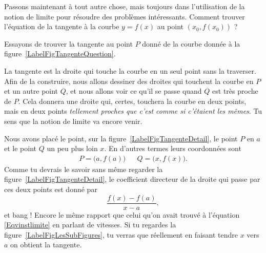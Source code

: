 Passons maintenant à tout autre chose, mais toujours dans l'utilisation de la notion de limite pour résoudre des problèmes intéressants. Comment trouver l'équation de la tangente à la courbe $y=f(x)$ au point $(x_0,f(x_0))$ ?

Essayons de trouver la tangente au point $P$ donné de la courbe donnée à la figure~\ref{LabelFigTangenteQuestion}.

\newcommand{\CaptionFigTangenteQuestion}{Comment trouver la tangente à la courbe au point $P$ ?}


La tangente est la droite qui touche la courbe en un seul point sans la traverser. Afin de la construire, nous allons dessiner des droites qui touchent la courbe en $P$ et un autre point $Q$, et nous allons voir ce qu'il se passe quand $Q$ est très proche de $P$. Cela donnera une droite qui, certes, touchera la courbe en deux points, mais en deux points \emph{tellement proches que c'est comme si c'étaient les mêmes}. Tu sens que la notion de limite va encore venir.

\newcommand{\CaptionFigTangenteDetail}{Traçons d'abord une corde entre le point $P$ et un point $Q$ un peu plus loin.}


Nous avons placé le point, sur la figure~\ref{LabelFigTangenteDetail}, le point $P$ en $a$ et le point $Q$ un peu plus loin $x$. En d'autres termes leurs coordonnées sont
\begin{align}
	P=\big(a,f(a)\big)&& Q=\big(x,f(x)\big).
\end{align}
Comme tu devrais le savoir sans même regarder la figure~\ref{LabelFigTangenteDetail}, le coefficient directeur de la droite qui passe par ces deux points est donné par
\begin{equation}
	\frac{ f(x)-f(a) }{ x-a },
\end{equation}
et bang ! Encore le même rapport que celui qu'on avait trouvé à l'équation \eqref{Eqvinstlimite} en parlant de vitesses. Si tu regardes la figure~\ref{LabelFigLesSubFigures}, tu verras que réellement en faisant tendre $x$ vers $a$ on obtient la tangente.

\newcommand{\CaptionFigLesSubFigures}{Recherche de la tangente par approximations successives.}


